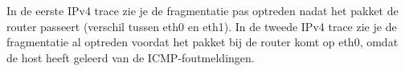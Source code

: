 In de eerste IPv4 trace zie je de fragmentatie pas optreden nadat het pakket de router passeert (verschil tussen eth0 en eth1). In de tweede IPv4 trace zie je de fragmentatie al optreden voordat het pakket bij de router komt op eth0, omdat de host heeft geleerd van de ICMP-foutmeldingen.